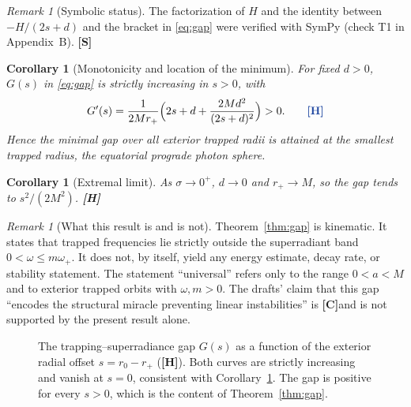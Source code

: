 \documentclass[11pt,a4paper]{article}
\newcommand{\VS}{\textcolor{vs}{\textbf{[S]}}}
\newcommand{\VH}{\textcolor{vh}{\textbf{[H]}}}
\newcommand{\CC}{\textcolor{cc}{\textbf{[C]}}}
\newtheorem{corollary}[theorem]{Corollary}
\theoremstyle{remark}
\newtheorem{remark}[theorem]{Remark}
\theoremstyle{definition}
\begin{document}
\begin{remark}[Symbolic status]
The factorization of $H$ and the identity between $-H/(2s+d)$ and the bracket in \eqref{eq:gap} were verified with SymPy (check T1 in Appendix~B). \VS
\end{remark}

\begin{corollary}[Monotonicity and location of the minimum]
\label{cor:mono}
For fixed $d>0$, $G(s)$ in \eqref{eq:gap} is strictly increasing in $s>0$, with
\[
G'(s) = \frac{1}{2Mr_+}\Bigl(2s + d + \frac{2Md^2}{(2s+d)^2}\Bigr) > 0. \tag*{\VH}
\]
Hence the minimal gap over all exterior trapped radii is attained at the smallest trapped radius, the equatorial prograde photon sphere.
\end{corollary}

\begin{corollary}[Extremal limit]
As $\sigma \to 0^+$, $d \to 0$ and $r_+ \to M$, so the gap tends to $s^2/(2M^2)$. \VH
\end{corollary}

\begin{remark}[What this result is and is not]
Theorem~\ref{thm:gap} is kinematic. It states that trapped frequencies lie strictly outside the superradiant band $0<\omega\le m\omega_+$. It does not, by itself, yield any energy estimate, decay rate, or stability statement. The statement ``universal'' refers only to the range $0<a<M$ and to exterior trapped orbits with $\omega, m > 0$. The drafts' claim that this gap ``encodes the structural miracle preventing linear instabilities'' is \CC and is not supported by the present result alone.
\end{remark}

\begin{figure}[H]
\centering
{}
\caption{The trapping--superradiance gap $G(s)$ as a function of the exterior radial offset $s = r_0 - r_+$ (\VH). Both curves are strictly increasing and vanish at $s = 0$, consistent with Corollary~\ref{cor:mono}. The gap is positive for every $s>0$, which is the content of Theorem~\ref{thm:gap}.}
\label{fig:gap}
\end{figure}
\end{document}

